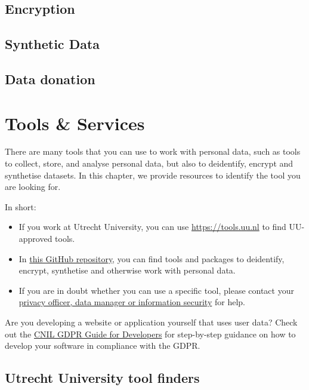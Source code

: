 \documentclass[
]{book}
\providecommand{\tightlist}{%
  \setlength{\itemsep}{0pt}\setlength{\parskip}{0pt}}
\begin{document}
\hypertarget{encryption}{%
\section{Encryption}\label{encryption}}

\hypertarget{synthetic-data}{%
\section{Synthetic Data}\label{synthetic-data}}

\hypertarget{data-donation}{%
\section{Data donation}\label{data-donation}}

\hypertarget{tools-and-services}{%
\chapter{Tools \& Services}\label{tools-and-services}}

There are many tools that you can use to work with personal data, such as tools
to collect, store, and analyse personal data, but also to deidentify, encrypt
and synthetise datasets. In this chapter, we provide resources to identify
the tool you are looking for.

In short:

\begin{itemize}
\tightlist
\item
  If you work at Utrecht University, you can use \url{https://tools.uu.nl} to find UU-approved tools.
\item
  In \href{https://github.com/UtrechtUniversity/privacy-engineering-tools/}{this GitHub repository},
  you can find tools and packages to deidentify, encrypt, synthetise and otherwise
  work with personal data.
\item
  If you are in doubt whether you can use a specific tool, please contact your
  \protect\hyperlink{support}{privacy officer, data manager or information security} for help.
\end{itemize}

Are you developing a website or application yourself that uses user data? Check
out the \href{https://lincnil.github.io/GDPR-Developer-Guide/}{CNIL GDPR Guide for Developers}
for step-by-step guidance on how to develop your software in compliance with the GDPR.

\hypertarget{uu-tools}{%
\section{Utrecht University tool finders}\label{uu-tools}}
\end{document}
